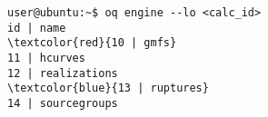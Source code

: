 \begin{Verbatim}[frame=single, commandchars=\\\{\}, fontsize=\small]
user@ubuntu:~$ oq engine --lo <calc_id>
id | name
\textcolor{red}{10 | gmfs}
11 | hcurves
12 | realizations
\textcolor{blue}{13 | ruptures}
14 | sourcegroups
\end{Verbatim}
